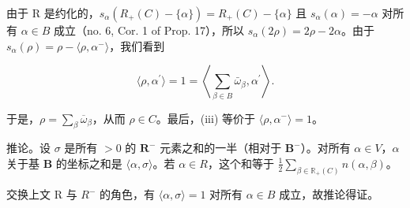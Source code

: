 由于 R 是约化的，\(s_{\alpha}(R_{+}(C) - \{\alpha\}) = R_{+}(C) - \{\alpha\}\) 且 \(s_{\alpha}(\alpha) = -\alpha\) 对所有 \(\alpha \in B\) 成立（no. 6, Cor. 1 of Prop. 17），所以 \(s_{\alpha}(2\rho) = 2\rho - 2\alpha\)。由于 \(s_{\alpha}(\rho) = \rho - \langle \rho, \alpha^{-} \rangle\)，我们看到

\[
\langle \rho , \alpha^ {\prime} \rangle = 1 = \left\langle \sum_ {\beta \in B} \bar {\omega} _ {\beta}, \alpha^ {\prime} \right\rangle .
\]

于是，\(\rho = \sum_{\beta} \overline{\omega}_{\beta}\)，从而 \(\rho \in C\)。最后，(iii) 等价于 \(\langle \rho, \alpha^{-} \rangle = 1\)。

推论。设 \(\sigma\) 是所有 \(>0\) 的 \(\mathbf{R}^{-}\) 元素之和的一半（相对于 \(\mathbf{B}^{-}\)）。对所有 \(\alpha \in V\)，\(\alpha\) 关于基 \(\mathbf{B}\) 的坐标之和是 \(\langle \alpha, \sigma \rangle\)。若 \(\alpha \in R\)，这个和等于 \(\frac{1}{2} \sum_{\beta \in \mathbb{R}_{+}(C)} n(\alpha, \beta)\)。

交换上文 R 与 \(R^{-}\) 的角色，有 \(\langle\alpha,\sigma\rangle=1\) 对所有 \(\alpha\in B\) 成立，故推论得证。

